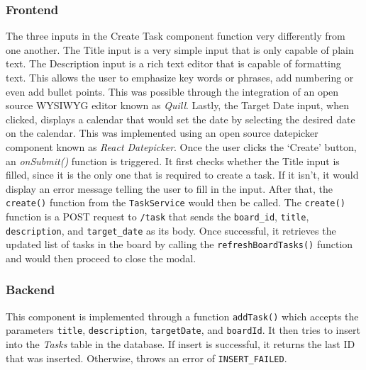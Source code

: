 \documentclass{article}
\def\code#1{\texttt{#1}}
\begin{document}
\subsubsection{Frontend}
The three inputs in the Create Task component function very differently from one
another. The Title input is a very simple input that is only capable of plain
text. The Description input is a rich text editor that is capable of formatting
text. This allows the user to emphasize key words or phrases, add numbering or
even add bullet points. This was possible through the integration of an open
source WYSIWYG editor known as \emph{Quill}. Lastly, the Target Date input, when
clicked, displays a calendar that would set the date by selecting the desired
date on the calendar. This was implemented using an open source datepicker
component known as \emph{React Datepicker}. Once the user clicks the ‘Create’
button, an \emph{onSubmit()} function is triggered. It first checks whether the
Title input is filled, since it is the only one that is required to create a
task. If it isn’t, it would display an error message telling the user to fill in
the input. After that, the \code{create()} function from the \code{TaskService}
would then be called. The \code{create()} function is a POST request to
\code{/task} that sends the \code{board\_id}, \code{title}, \code{description},
and \code{target\_date} as its body. Once successful, it retrieves the updated
list of tasks in the board by calling the \code{refreshBoardTasks()} function
and would then proceed to close the modal.

\subsubsection{Backend}
This component is implemented through a function \code{addTask()} which accepts the
parameters \code{title}, \code{description}, \code{targetDate}, and \code{boardId}. It then tries to insert
into the \emph{Tasks} table in the database. If insert is successful, it returns the
last ID that was inserted. Otherwise, throws an error of \code{INSERT\_FAILED}.
\end{document}
